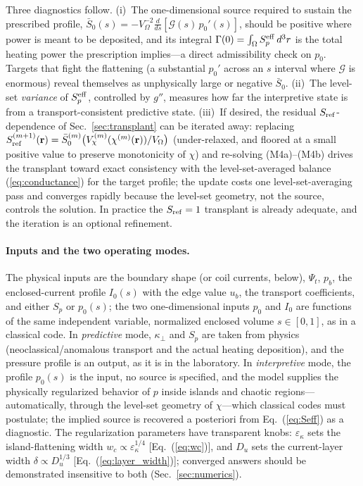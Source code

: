 \documentclass[english]{article}
\newcommand{\br}{\mathbf{r}}
\begin{document}
Three diagnostics follow. (i)~The one-dimensional source required to sustain the prescribed
profile,
$\bar S_0(s)=-V_\Omega^{-2}\tfrac{d}{ds}[\mathcal G(s)\,p_0'(s)]$, should be positive where power is meant to be
deposited, and its integral $\Gamma(0)=\int_\Omega S_p^{\rm eff}\,d^3r$ is the total heating power
the prescription implies---a direct admissibility check on $p_0$. Targets that fight the
flattening (a substantial $p_0'$ across an $s$ interval where $\mathcal G$ is enormous) reveal themselves
as unphysically large or negative $\bar S_0$. (ii)~The level-set \emph{variance} of $S_p^{\rm
eff}$, controlled by $g''$, measures how far the interpretive state is from a
transport-consistent predictive state. (iii)~If desired, the residual $S_{\rm ref}$-dependence of
Sec.~\ref{sec:transplant} can be iterated away: replacing
$S_{\rm ref}^{(m+1)}(\br)=\bar S_0^{(m)}\big(V_\chi^{(m)}(\chi^{(m)}(\br))/V_\Omega\big)$ (under-relaxed,
and floored at a small positive value to preserve monotonicity of $\chi$) and re-solving
(M4a)--(M4b) drives the transplant toward exact consistency with the level-set-averaged balance
(\ref{eq:conductance}) for the target profile; the update costs one level-set-averaging pass and
converges rapidly because the level-set geometry, not the source, controls the solution. In
practice the $S_{\rm ref}=1$ transplant is already adequate, and the iteration is an optional
refinement.

\paragraph{Inputs and the two operating modes.}
The physical inputs are the boundary shape (or coil currents, below), $\Psi_t$, $p_b$, the
enclosed-current profile $I_0(s)$ with the edge value $u_b$, the transport coefficients, and either
$S_p$ or $p_0(s)$; the two one-dimensional inputs $p_0$ and $I_0$ are functions of the same
independent variable, normalized enclosed volume $s\in[0,1]$, as in a classical code. In \emph{predictive} mode, $\kappa_\perp$
and $S_p$ are taken from physics (neoclassical/anomalous transport and the actual heating
deposition), and the pressure profile is an output, as it is in the laboratory. In
\emph{interpretive} mode, the profile $p_0(s)$ is the input, no source is specified, and the model
supplies the physically regularized behavior of $p$ inside islands and chaotic
regions---automatically, through the level-set geometry of $\chi$---which classical codes must
postulate; the implied source is recovered a posteriori from Eq.~(\ref{eq:Seff}) as a diagnostic.
The regularization parameters have transparent knobs: $\varepsilon_\kappa$ sets the
island-flattening width $w_c\propto\varepsilon_\kappa^{1/4}$ [Eq.~(\ref{eq:wc})], and $D_u$ sets
the current-layer width $\delta\propto D_u^{1/3}$ [Eq.~(\ref{eq:layer_width})]; converged answers
should be demonstrated insensitive to both (Sec.~\ref{sec:numerics}).
\end{document}
